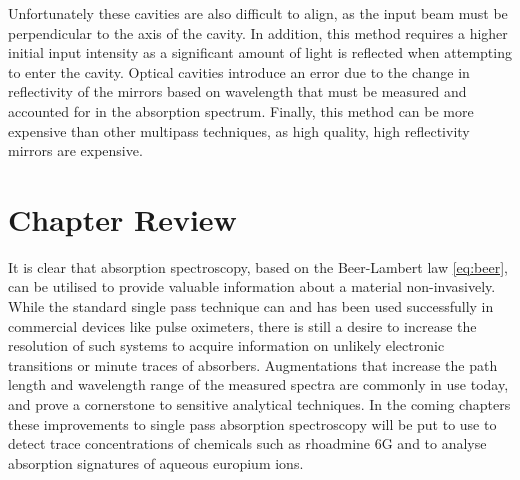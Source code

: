 Unfortunately these cavities are also difficult to align, as the input beam
must be perpendicular to the axis of the cavity. In addition, this method
requires a higher initial input intensity as a significant amount of light is
reflected when attempting to enter the cavity. Optical cavities introduce an
error due to the change in reflectivity of the mirrors based on wavelength that
must be measured and accounted for in the absorption spectrum. Finally, this
method can be more expensive than other multipass techniques, as high quality,
high reflectivity mirrors are expensive.




\section*{Chapter Review}

It is clear that absorption spectroscopy, based on the Beer-Lambert law
\eqref{eq:beer}, can be utilised to provide valuable information about a
material non-invasively. While the standard single pass technique can and has
been used successfully in commercial devices like pulse oximeters, there is
still a desire to increase the resolution of such systems to acquire
information on unlikely electronic transitions or minute traces of absorbers.
Augmentations that increase the path length and wavelength range of the
measured spectra are commonly in use today, and prove a cornerstone to
sensitive analytical techniques. In the coming chapters these improvements to
single pass absorption spectroscopy will be put to use to detect trace
concentrations of chemicals such as rhoadmine 6G and to analyse absorption
signatures of aqueous europium ions.
